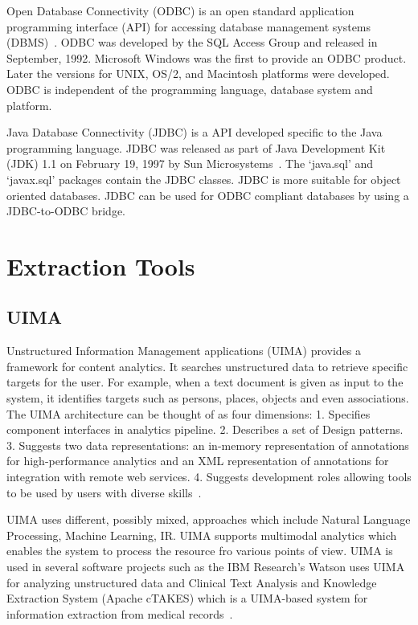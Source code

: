 Open Database Connectivity (ODBC) is an open standard application
programming interface (API) for accessing database management systems
(DBMS)~\cite{www-odbc}. ODBC was developed by the SQL Access Group and
released in September, 1992. Microsoft Windows was the first to
provide an ODBC product. Later the versions for UNIX, OS/2, and
Macintosh platforms were developed. ODBC is independent of the
programming language, database system and platform.

Java Database Connectivity (JDBC) is a API developed specific to the
Java programming language. JDBC was released as part of Java
Development Kit (JDK) 1.1 on February 19, 1997 by Sun
Microsystems~\cite{www-jdbc}. The ‘java.sql’ and ‘javax.sql’ packages
contain the JDBC classes. JDBC is more suitable for object oriented
databases. JDBC can be used for ODBC compliant databases by using a
JDBC-to-ODBC bridge.

\section{Extraction Tools}
\label{S:o-Tools}


\subsection{UIMA }

Unstructured Information Management applications (UIMA) provides a
framework for content analytics. It searches unstructured data to
retrieve specific targets for the user. For example, when a text
document is given as input to the system, it identifies targets such
as persons, places, objects and even associations. The UIMA
architecture can be thought of as four dimensions: 1. Specifies
component interfaces in analytics pipeline.  2. Describes a set of
Design patterns. 3. Suggests two data representations: an in-memory
representation of annotations for high-performance analytics and an
XML representation of annotations for integration with remote web
services. 4. Suggests development roles allowing tools to be used by
users with diverse skills~\cite{www-wiki-uima}.

UIMA uses different, possibly mixed, approaches which include Natural
Language Processing, Machine Learning, IR. UIMA supports multimodal
analytics which enables the system to process the resource fro various
points of view. UIMA is used in several software projects such as the
IBM Research's Watson uses UIMA for analyzing unstructured data and
Clinical Text Analysis and Knowledge Extraction System (Apache cTAKES)
which is a UIMA-based system for information extraction from medical
records~\cite{www-uima-slideshare}.

